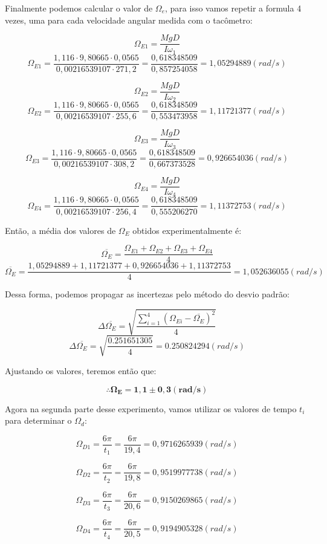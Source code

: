 Finalmente podemos calcular o valor de $\Omega _e$, para isso vamos repetir a formula 4 vezes, uma para cada velocidade angular medida com o tacômetro:

\[ \Omega _{E1} = \frac{MgD}{I \omega _1} \]
\[ \Omega _{E1} = \frac{1,116 \cdot 9,80665 \cdot 0,0565}{0,00216539107 \cdot 271,2} = \frac{0,618348509}{0,857254058} = 1,05294889 (rad/s)\]

\[ \Omega _{E2} = \frac{MgD}{I \omega _2} \]
\[ \Omega _{E2} = \frac{1,116 \cdot 9,80665 \cdot 0,0565}{0,00216539107 \cdot 255,6} = \frac{0,618348509}{0,553473958} = 1,11721377 (rad/s)\]

\[ \Omega _{E3} = \frac{MgD}{I \omega _3} \]
\[ \Omega _{E3} = \frac{1,116 \cdot 9,80665 \cdot 0,0565}{0,00216539107 \cdot 308,2} = \frac{0,618348509}{0,667373528} = 0,926654036 (rad/s)\]

\[ \Omega _{E4} = \frac{MgD}{I \omega _4} \]
\[ \Omega _{E4} = \frac{1,116 \cdot 9,80665 \cdot 0,0565}{0,00216539107 \cdot 256,4} = \frac{0,618348509}{0,555206270} = 1,11372753 (rad/s)\]

Então, a média dos valores de $\Omega _E$ obtidos experimentalmente é:

\[ \overline{\Omega _E} = \frac{\Omega _{E1} + \Omega _{E2} + \Omega _{E3} + \Omega _{E4}}{4} \]
\[ \overline{\Omega _E} = \frac{1,05294889 + 1,11721377 + 0,926654036 + 1,11372753}{4} = 1,052636055 (rad/s) \]

Dessa forma, podemos propagar as incertezas pelo método do desvio padrão:

\[ \Delta \overline{\Omega _E} = \sqrt{\frac{\sum_{i=1}^{4} (\Omega _{Ei} - \overline{\Omega _E})^2}{4}}\]
\[ \Delta \overline{\Omega _E} = \sqrt{\frac{0.251651305}{4}} = 0.250824294 (rad/s)\]

Ajustando os valores, teremos então que:

\[ \therefore \mathbf{\Omega _E = 1,1 \pm 0,3 (rad/s)}\]

Agora na segunda parte desse experimento, vamos utilizar os valores de tempo $t_i$ para determinar o $\Omega _d$:

\[ \Omega _{D1} = \frac{6 \pi}{t_1} = \frac{6 \pi}{19,4} = 0,9716265939 (rad/s)\]

\[ \Omega _{D2} = \frac{6 \pi}{t_2} = \frac{6 \pi}{19,8} = 0,9519977738 (rad/s)\]

\[ \Omega _{D3} = \frac{6 \pi}{t_3} = \frac{6 \pi}{20,6} = 0,9150269865 (rad/s)\]

\[ \Omega _{D4} = \frac{6 \pi}{t_4} = \frac{6 \pi}{20,5} = 0,9194905328 (rad/s)\]

